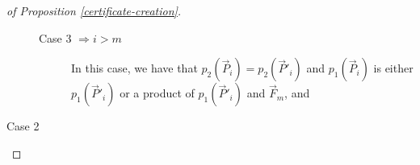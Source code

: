 \documentclass[twocolumn,showpacs,preprintnumbers,amsmath,amssymb,nofootinbib,pra,floatfix]{revtex4-1}
\newcommand{\lst}{\vec}
\begin{document}
\begin{proof}[of Proposition \ref{certificate-creation}]
\begin{description}
\begin{description}
\item[Case 3 $\Rightarrow i > m$]
In this case, we have that $p_2(\lst P_i)=p_2(\lst P'_i)$ and $p_1(\lst P_i)$ is either $p_1(\lst P'_i)$ or a product of $p_1(\lst P'_i)$ and $\lst F_m$, and 
\end{description}

\item[Case 2]

\end{description}

\end{proof}
\end{document}

